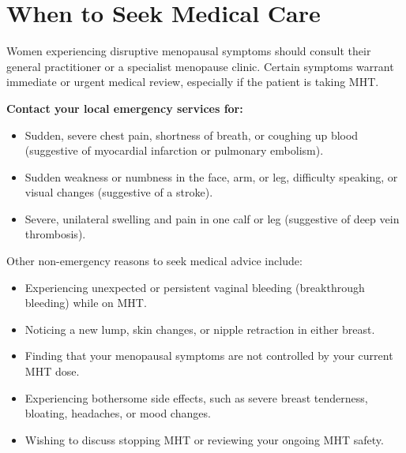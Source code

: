 \section*{When to Seek Medical Care}
Women experiencing disruptive menopausal symptoms should consult their general practitioner or a specialist menopause clinic. Certain symptoms warrant immediate or urgent medical review, especially if the patient is taking MHT.

\textbf{Contact your local emergency services for:}
\begin{itemize}
    \item Sudden, severe chest pain, shortness of breath, or coughing up blood (suggestive of myocardial infarction or pulmonary embolism).
    \item Sudden weakness or numbness in the face, arm, or leg, difficulty speaking, or visual changes (suggestive of a stroke).
    \item Severe, unilateral swelling and pain in one calf or leg (suggestive of deep vein thrombosis).
\end{itemize}

Other non-emergency reasons to seek medical advice include:
\begin{itemize}
    \item Experiencing unexpected or persistent vaginal bleeding (breakthrough bleeding) while on MHT.
    \item Noticing a new lump, skin changes, or nipple retraction in either breast.
    \item Finding that your menopausal symptoms are not controlled by your current MHT dose.
    \item Experiencing bothersome side effects, such as severe breast tenderness, bloating, headaches, or mood changes.
    \item Wishing to discuss stopping MHT or reviewing your ongoing MHT safety.
\end{itemize}

